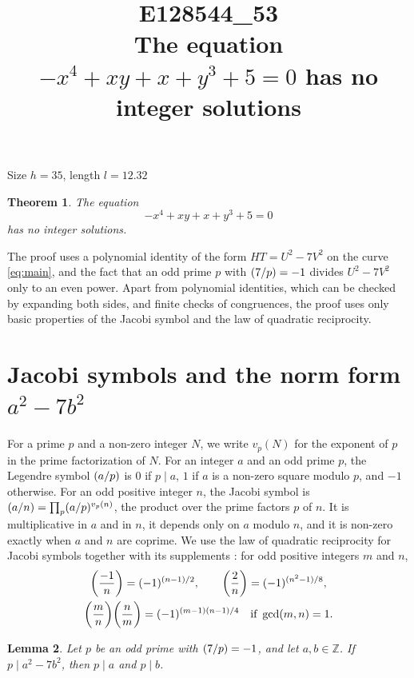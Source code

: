 \documentclass[11pt]{article}
\title{\textbf{E128544\_53}\\[4pt] {\Large The equation $-x^{4}+xy+x+y^{3}+5=0$ has no integer solutions}}
\author{}
\date{}
\newtheorem{theorem}{Theorem}
\newtheorem{lemma}[theorem]{Lemma}
\newcommand{\Z}{\mathbb{Z}}
\newcommand{\leg}[2]{\mathchoice{\biggl(\dfrac{#1}{#2}\biggr)}{(#1/#2)}{(#1/#2)}{(#1/#2)}}
\begin{document}
\maketitle
\vspace{-8ex}
\begin{center}
Size $h=35$, length $l=12.32$
\end{center}

\begin{theorem}\label{thm:main}
The equation
\begin{equation}\label{eq:main}
-x^{4}+xy+x+y^{3}+5=0
\end{equation}
has no integer solutions.
\end{theorem}

The proof uses a polynomial identity of the form $HT=U^2-7V^2$ on the curve \eqref{eq:main}, and the fact that an odd prime $p$ with $\leg{7}{p}=-1$ divides $U^2-7V^2$ only to an even power. Apart from polynomial identities, which can be checked by expanding both sides, and finite checks of congruences, the proof uses only basic properties of the Jacobi symbol and the law of quadratic reciprocity.

\section{\texorpdfstring{Jacobi symbols and the norm form $a^2-7b^2$}{Jacobi symbols and the norm form}}

For a prime $p$ and a non-zero integer $N$, we write $v_p(N)$ for the exponent of $p$ in the prime factorization of $N$. For an integer $a$ and an odd prime $p$, the Legendre symbol $\leg{a}{p}$ is $0$ if $p\mid a$, $1$ if $a$ is a non-zero square modulo $p$, and $-1$ otherwise. For an odd positive integer $n$, the Jacobi symbol is $\leg{a}{n}=\prod_p\leg{a}{p}^{v_p(n)}$, the product over the prime factors $p$ of $n$. It is multiplicative in $a$ and in $n$, it depends only on $a$ modulo $n$, and it is non-zero exactly when $a$ and $n$ are coprime. We use the law of quadratic reciprocity for Jacobi symbols together with its supplements \cite[Chapter~5, \S2]{IR}: for odd positive integers $m$ and $n$,
\begin{gather*}
\leg{-1}{n}=(-1)^{(n-1)/2},\qquad\leg{2}{n}=(-1)^{(n^2-1)/8},\\
\leg{m}{n}\leg{n}{m}=(-1)^{(m-1)(n-1)/4}\quad\text{if }\gcd(m,n)=1.
\end{gather*}

\begin{lemma}\label{lem:divides}
Let $p$ be an odd prime with $\leg{7}{p}=-1$, and let $a,b\in\Z$. If $p\mid a^2-7b^2$, then $p\mid a$ and $p\mid b$.
\end{lemma}
\end{document}
